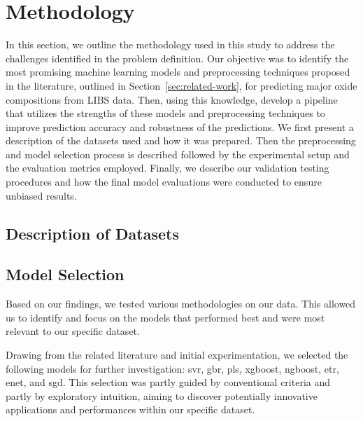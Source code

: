 \section{Methodology}\label{sec:methodology}
In this section, we outline the methodology used in this study to address the challenges identified in the problem definition. Our objective was to identify the most promising machine learning models and preprocessing techniques proposed in the literature, outlined in Section~\ref{sec:related-work}, for predicting major oxide compositions from LIBS data. Then, using this knowledge, develop a pipeline that utilizes the strengths of these models and preprocessing techniques to improve prediction accuracy and robustness of the predictions.
We first present a description of the datasets used and how it was prepared. Then the preprocessing and model selection process is described followed by the experimental setup and the evaluation metrics employed. Finally, we describe our validation testing procedures and how the final model evaluations were conducted to ensure unbiased results.

\subsection{Description of Datasets}

\subsection{Model Selection}

Based on our findings, we tested various methodologies on our data.
This allowed us to identify and focus on the models that performed best and were most relevant to our specific dataset.

Drawing from the related literature and initial experimentation, we selected the following models for further investigation: \gls{svr}, \gls{gbr}, \gls{pls}, \gls{xgboost}, \gls{ngboost}, \gls{etr}, \gls{enet}, and \gls{sgd}.
This selection was partly guided by conventional criteria and partly by exploratory intuition, aiming to discover potentially innovative applications and performances within our specific dataset.

